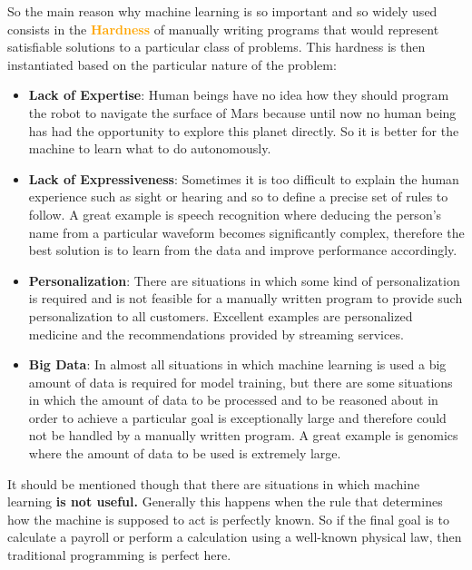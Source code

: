 \vspace{5mm}

So the main reason why machine learning is so important and so widely used consists in the \textcolor{orange}{\textbf{Hardness}} of manually writing programs that would represent satisfiable solutions to a particular class of problems. This hardness is then instantiated based on the particular nature of the problem:

\newpage

\begin{itemize}
    \item \textbf{Lack of Expertise}: Human beings have no idea how they should program the robot to navigate the surface of Mars because until now no human being has had the opportunity to explore this planet directly. So it is better for the machine to learn what to do autonomously.
    \item \textbf{Lack of Expressiveness}: Sometimes it is too difficult to explain the human experience such as sight or hearing and so to define a precise set of rules to follow. A great example is speech recognition where deducing the person's name from a particular waveform becomes significantly complex, therefore the best solution is to learn from the data and improve performance accordingly.
    \item \textbf{Personalization}: There are situations in which some kind of personalization is required and is not feasible for a manually written program to provide such personalization to all customers. Excellent examples are personalized medicine and the recommendations provided by streaming services.
    \item \textbf{Big Data}: In almost all situations in which machine learning is used a big amount of data is required for model training, but there are some situations in which the amount of data to be processed and to be reasoned about in order to achieve a particular goal is exceptionally large and therefore could not be handled by a manually written program. A great example is genomics where the amount of data to be used is extremely large.
\end{itemize}

\vspace{5mm}

It should be mentioned though that there are situations in which machine learning \textbf{is not useful.} Generally this happens when the rule that determines how the machine is supposed to act is perfectly known. So if the final goal is to calculate a payroll or perform a calculation using a well-known physical law, then traditional programming is perfect here.

